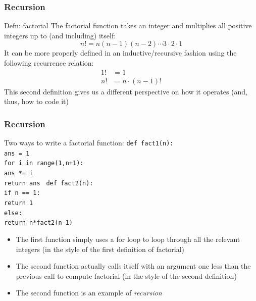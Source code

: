 \documentclass{beamer}
\newcommand{\code}[1]{\texttt{#1}}
\newcommand{\tab}{\hspace*{22pt}}
\begin{document}
\begin{frame}%
	\frametitle{Recursion}
	
	\begin{block}{Defn: factorial}
		The factorial function takes an integer and multiplies all positive integers up to (and including) itself:
		\begin{equation*}
			n! = n(n-1)(n-2) \cdots 3 \cdot 2 \cdot 1
		\end{equation*}
		It can be more properly defined in an inductive/recursive fashion using the following recurrence relation:
		\begin{equation*}
			\begin{split}
				1! & = 1 \\
				n! & = n\cdot(n-1)!
			\end{split}
		\end{equation*}	
		This second definition gives us a different perspective on how it operates (and, thus, how to code it)
	\end{block}
	
\end{frame}

\begin{frame}%
	\frametitle{Recursion}
	
	\begin{block}{Two ways to write a factorial function:}
			\code{def fact1(n): \\
					\tab ans = 1 \\
					\tab for i in range(1,n+1): \\
					\tab \tab ans *= i \\
					\tab return ans
			}
		\endminipage\hfill
			\code{def fact2(n): \\
					\tab if n == 1: \\
					\tab \tab return 1 \\
					\tab else: \\
					\tab \tab return n*fact2(n-1)
			}
		\endminipage\hfill
		
		\vspace{10pt}
		\begin{itemize}
			\item The first function simply uses a for loop to loop through all the relevant integers (in the style of the first definition of factorial)
			\item The second function actually calls itself with an argument one less than the previous call to compute factorial (in the style of the second definition)
			\item The second function is an example of \emph{recursion}
		\end{itemize}
	\end{block}
	
\end{frame}
\end{document}
